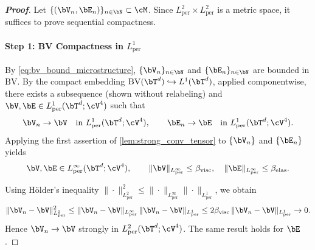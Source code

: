 \begin{proof}[\bf Proof]
Let $\{(\bV_n,\bE_n)\}_{n\in\bN}\subset \cM$. Since $L^2_{\mathrm{per}}\times L^2_{\mathrm{per}}$ is a metric space, it suffices to prove sequential compactness.

\paragraph{Step 1: BV Compactness in $L^1_{\mathrm{per}}$}
By \cref{eq:bv_bound_microstructure}, $\{\bV_n\}_{n\in\bN}$ and $\{\bE_n\}_{n\in\bN}$ are bounded in
$\mathrm{BV}$. By the compact embedding $\mathrm{BV}(\bT^d)\hookrightarrow L^1(\bT^d)$, applied componentwise, there exists a subsequence (shown without relabeling) and
$\bV,\bE\in L^1_{\mathrm{per}}(\bT^d;\cV^{4})$ such that
\begin{align}
\label{eq:L1_conv_app}
\bV_n \to \bV \quad\text{in }L^1_{\mathrm{per}}(\bT^d;\cV^{4}),
\qquad
\bE_n \to \bE \quad\text{in }L^1_{\mathrm{per}}(\bT^d;\cV^{4}).
\end{align}
Applying the first assertion of \cref{lem:strong_conv_tensor} to $\{\bV_n\}$ and $\{\bE_n\}$ yields
\begin{equation*}
\bV,\bE\in L^\infty_{\mathrm{per}}(\bT^d;\cV^4),
\qquad
\|\bV\|_{L^\infty_{\mathrm{per}}}\le \beta_{\rm visc},
\quad
\|\bE\|_{L^\infty_{\mathrm{per}}}\le \beta_{\rm elas}.
\end{equation*}

Using H\"older's inequality $\|\cdot\|_{L^2_{\mathrm{per}}}^2\leq \|\cdot\|_{L^\infty_{\mathrm{per}}}\|\cdot\|_{L^1_{\mathrm{per}}}$, we obtain
\begin{equation*}
\|\bV_n-\bV\|_{L^2_{\mathrm{per}}}^2
\leq \|\bV_n-\bV\|_{L^\infty_{\mathrm{per}}}\,\|\bV_n-\bV\|_{L^1_{\mathrm{per}}}
\le 2\beta_{\rm visc}\,\|\bV_n-\bV\|_{L^1_{\mathrm{per}}}\to 0.
\end{equation*}
Hence $\bV_n\to \bV$ strongly in $L^2_{\mathrm{per}}(\bT^d;\cV^{4})$. The same result holds for $\bE$.


\end{proof}
